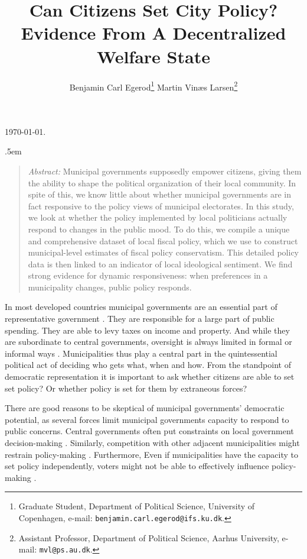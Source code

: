\documentclass[a4paper,12pt]{article}
\title{\bigskip \bigskip \sffamily \LARGE{Can Citizens Set City Policy?} \\ \Large{ Evidence From A Decentralized Welfare State}}
\author{\bigskip Benjamin Carl Egerod\footnote[2]{Graduate Student, Department of Political Science, University of Copenhagen, e-mail: \texttt{benjamin.carl.egerod@ifs.ku.dk}.} \qquad Martin Vinæs Larsen\footnote[3]{Assistant Professor, Department of Political Science, Aarhus University, e-mail: \texttt{mvl@ps.au.dk}.}}
\makeatletter
\renewcommand{\maketitle}{
	\begin{flushleft}
		
		\onehalfspacing
		
		\@title
		
		\lineskip .5em
		\normalfont{\normalsize{\@author}}
\end{flushleft}}
\makeatother
\begin{document}
	
	\begin{footnotesize} \noindent \today. \end{footnotesize} %
	
	\vspace{0.7in}
	
	\maketitle
	
	\bigskip
	
	\begin{quotation} %

		\small \noindent \emph{Abstract:} Municipal governments supposedly empower citizens, giving them the ability to shape the political organization of their local community. In spite of this, we know little about whether municipal governments are in fact responsive to the policy views of municipal electorates. In this study, we look at whether the policy implemented by local politicians actually respond to changes in the public mood. To do this, we compile a unique and comprehensive dataset of local fiscal policy, which we use to construct municipal-level estimates of fiscal policy conservatism. This detailed policy data is then linked to an indicator of local ideological sentiment. We find strong evidence for dynamic responsiveness: when preferences in a municipality changes, public policy responds.
	\end{quotation}



	
	\thispagestyle{empty} %
	
	
\clearpage


\noindent In most developed countries municipal governments are an essential part of representative government \citep{trounstine2009all,kersting2013reforming}. They are responsible for a large part of public spending.  They are able to levy taxes on income and property. And while they are subordinate to central governments, oversight is always limited in formal or informal ways \citep{oecd2016subnational}. Municipalities thus play a central part in the quintessential political act of deciding who gets what, when and how. From the standpoint of democratic representation it is important to ask whether citizens are able to set set policy? Or whether policy is set for them by extraneous forces?


There are good reasons to be skeptical of municipal governments' democratic potential, as  several forces limit municipal governments capacity to respond to public concerns. Central governments often put constraints on local government decision-making \citep{peterson1981city}. Similarly, competition with other adjacent municipalities might restrain policy-making \citep{salmon2006horizontal,tiebout1956pure}. Furthermore, Even if municipalities have the capacity to set policy independently, voters might not be able to effectively influence policy-making \citep[e.g.,][]{sances2017attribution,gerber2011mayors}. 
\end{document}
